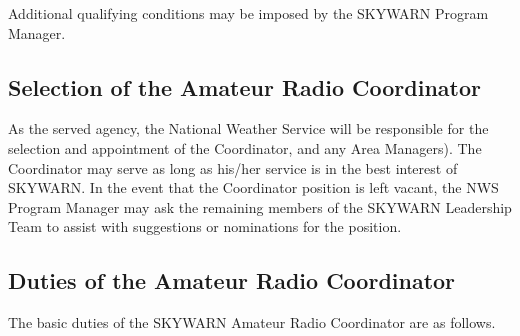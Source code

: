 \documentclass[pdflatex,letterpaper,twoside,12pt]{book}
\begin{document}
Additional qualifying conditions may be imposed by the SKYWARN Program Manager.

\subsection{Selection of the Amateur Radio Coordinator}

As the served agency, the National Weather Service will be responsible for the selection and appointment of the Coordinator, and any Area Managers).  The Coordinator may serve as long as his/her service is in the best interest of SKYWARN.  In the event that the Coordinator position is left vacant, the NWS Program Manager may ask the remaining members of the SKYWARN Leadership Team to assist with suggestions or nominations for the position.

\subsection{Duties of the Amateur Radio Coordinator}

The basic duties of the SKYWARN Amateur Radio Coordinator are as follows.
\end{document}
